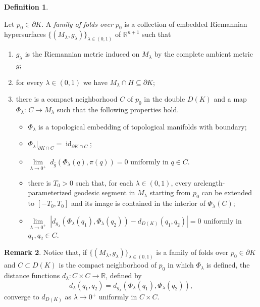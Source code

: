 \documentclass[11pt]{article}
\theoremstyle{definition}
\newtheorem{definition}{Definition}[section]
\newtheorem{remark}[definition]{Remark}
\theoremstyle{remark}
\theoremstyle{plain}
\DeclareMathOperator{\id}{id}
\newcommand{\R}{\mathbb{R}}
\newcommand{\g}{\overline{g}}
\begin{document}
\begin{definition}\label{def:family_folds}

Let $p_0\in \partial K$. A \emph{family of folds over $p_0$} is a collection of embedded Riemannian hypersurfaces $\{(M_\lambda,g_\lambda)\}_{\lambda\in(0,1)}$ of $\R^{n+1}$ such that

\begin{enumerate}
  \item $g_\lambda$ is the Riemannian metric induced on $M_\lambda$ by the complete ambient metric $\g$;
  \item for every $\lambda\in (0,1)$ we have $M_\lambda\cap H \subseteq \partial K$;
  \item there is a compact neighborhood $C$ of $p_0$ in the double $D(K)$ and a map $\Phi_\lambda:\, C\to M_\lambda$ such that the following properties hold.
      \begin{itemize}
        \item $\Phi_\lambda$ is a topological embedding of topological manifolds with boundary;
        \item $\Phi_\lambda\big|_{\partial K\cap C} = \id_{\partial K\cap C}$;\vskip0.2cm
        \item $\lim\limits_{\lambda\to 0^+}\; d_{\g} (\Phi_\lambda(q), \pi(q)) = 0$ uniformly in $q\in C$.
        \item there is $T_0>0$ such that, for each $\lambda\in (0,1)$, every arclength-parameterized geodesic segment in $M_\lambda$ starting from $p_0$ can be extended to $[-T_0,T_0]$ and its image is contained in the interior of $\Phi_\lambda(C)$;
        \item $\lim\limits_{\lambda\to 0^+}\;\left|d_{g_\lambda}(\Phi_\lambda(q_1), \Phi_\lambda(q_2)) - d_{D(K)}(q_1,q_2)\right| = 0$ uniformly in $q_1,q_2\in C$.
      \end{itemize}
\end{enumerate}

\end{definition}

\begin{remark}
  Notice that, if $\{(M_\lambda,g_\lambda)\}_{\lambda\in(0,1)}$ is a family of folds over $p_0\in \partial K$ and $C\subset D(K)$ is the compact neighborhood of $p_0$ in which $\Phi_\lambda$ is defined, the distance functions $d_\lambda:C\times C\to \R$, defined by
  $$d_\lambda(q_1,q_2) = d_{g_\lambda}(\Phi_\lambda(q_1),\Phi_\lambda(q_2)),$$
  converge to $d_{D(K)}$ as $\lambda\to 0^+$ uniformly in $C\times C$.
\end{remark}
\end{document}
